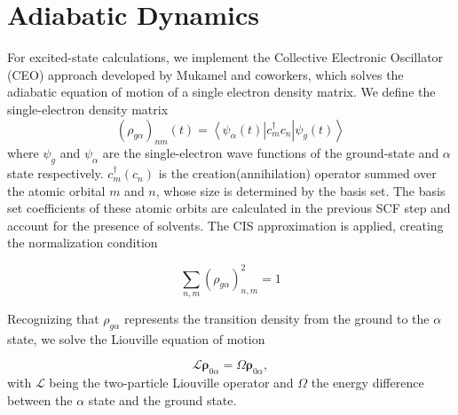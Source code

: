 \section{Adiabatic Dynamics}
    For excited-state calculations, we implement the Collective Electronic Oscillator (CEO) approach developed by Mukamel and coworkers, which solves the adiabatic equation of motion of a single electron density matrix.\cite{tretiak02_densit_matrix_analy_simul_elect,tommasini2001electronic}
    We define the single-electron density matrix
    \begin{equation}
      (\rho_{g\alpha})_{nm}(t) = \left< \psi_\alpha (t) \right| c_m^\dagger c_n \left | \psi_g (t) \right>
    \end{equation}
    where \(\psi_g\) and \(\psi_\alpha\) are the single-electron wave functions of the ground-state and \(\alpha\) state respectively.
    \(c_m^\dagger (c_n)\) is the creation(annihilation) operator summed over the atomic orbital \(m\) and \(n\), whose size is determined by the basis set.
    The basis set coefficients of these atomic orbits are calculated in the previous SCF step and account for the presence of solvents.
    The CIS approximation is applied, creating the normalization condition 

    \begin{equation}
      \sum_{n,m} (\rho_{g\alpha})^2_{n,m} = 1
    \end{equation}

    Recognizing that \(\rho_{g\alpha}\) represents the transition density from the ground to the \(\alpha\) state, we solve the Liouville equation of motion 

    \begin{equation}\label{eq:liouville}
      \mathcal{L}\bm{\rho}_{0\alpha} = \Omega \bm{\rho}_{0\alpha},
    \end{equation}
    with \(\mathcal{L}\) being the two-particle Liouville operator and \(\Omega\) the energy difference between the \(\alpha\) state and the ground state.

